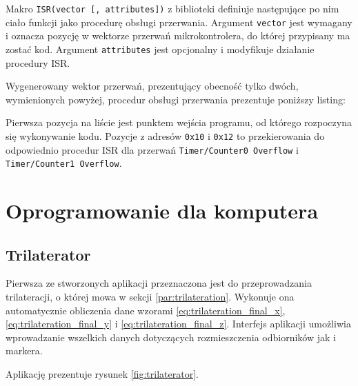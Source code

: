 Makro \texttt{ISR(vector [, attributes])} z biblioteki  definiuje następujące po nim ciało funkcji jako procedurę obsługi przerwania. Argument \texttt{vector} jest wymagany i oznacza pozycję w wektorze przerwań mikrokontrolera, do której przypisany ma zostać kod. Argument \texttt{attributes} jest opcjonalny i modyfikuje działanie procedury ISR.

Wygenerowany wektor przerwań, prezentujący obecność tylko dwóch, wymienionych powyżej, procedur obsługi przerwania prezentuje poniższy listing:



Pierwsza pozycja na liście jest punktem wejścia programu, od którego rozpoczyna się wykonywanie kodu. Pozycje z adresów \texttt{0x10} i \texttt{0x12} to przekierowania do odpowiednio procedur ISR dla przerwań \texttt{Timer/Counter0 Overflow} i \texttt{Timer/Counter1 Overflow}.

\section{Oprogramowanie dla komputera}
\subsection{Trilaterator}
Pierwsza ze stworzonych aplikacji przeznaczona jest do przeprowadzania trilateracji, o której mowa w sekcji \ref{par:trilateration}. Wykonuje ona automatycznie obliczenia dane wzorami \ref{eq:trilateration_final_x}, \ref{eq:trilateration_final_y} i \ref{eq:trilateration_final_z}. Interfejs aplikacji umożliwia wprowadzanie wszelkich danych dotyczących rozmieszczenia odbiorników jak i markera.

Aplikację prezentuje rysunek \ref{fig:trilaterator}.

